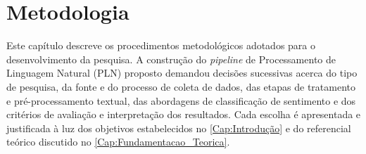 \chapter{Metodologia} \label{Cap:Metodologia}

Este capítulo descreve os procedimentos metodológicos adotados para o desenvolvimento da pesquisa. A construção do \textit{pipeline} de Processamento de Linguagem Natural (PLN) proposto demandou decisões sucessivas acerca do tipo de pesquisa, da fonte e do processo de coleta de dados, das etapas de tratamento e pré-processamento textual, das abordagens de classificação de sentimento e dos critérios de avaliação e interpretação dos resultados. Cada escolha é apresentada e justificada à luz dos objetivos
estabelecidos no \autoref{Cap:Introdução} e do referencial teórico discutido no \autoref{Cap:Fundamentacao_Teorica}.








%
